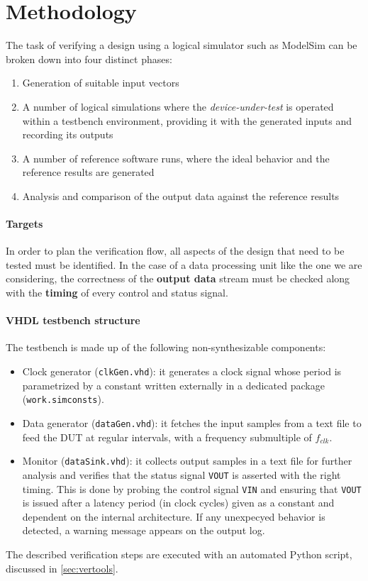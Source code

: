 \section{Methodology}
The task of verifying a design using a logical simulator such as ModelSim can be broken down into four distinct phases:
\begin{enumerate}
    \item Generation of suitable input vectors
    \item A number of logical simulations where the \textit{device-under-test} is operated within a testbench environment, providing it with the generated inputs and recording its outputs
    \item A number of reference software runs, where the ideal behavior and the reference results are generated
    \item Analysis and comparison of the output data against the reference results
\end{enumerate}

\paragraph{Targets} In order to plan the verification flow, all aspects of the design that need to be tested must be identified. In the case of a data processing unit like the one we are considering, the correctness of the \textbf{output data} stream must be checked along with the \textbf{timing} of every control and status signal.

\paragraph{VHDL testbench structure} The testbench is made up of the following non-synthesizable components:
\begin{itemize}
	\item Clock generator (\texttt{clkGen.vhd}): it generates a clock signal whose period is parametrized by a constant written externally in a dedicated package (\texttt{work.simconsts}).
	\item Data generator (\texttt{dataGen.vhd}): it fetches the input samples from a text file to feed the DUT at regular intervals, with a frequency submultiple of $f_{clk}$.
	\item Monitor (\texttt{dataSink.vhd}): it collects output samples in a text file for further analysis and verifies that the status signal \texttt{VOUT} is asserted with the right timing. This is done by probing the control signal \texttt{VIN} and ensuring that \texttt{VOUT} is issued after a latency period (in clock cycles) given as a constant and dependent on the internal architecture. If any unexpecyed behavior is detected, a warning message appears on the output log.
\end{itemize}

The described verification steps are executed with an automated Python script, discussed in \autoref{sec:vertools}.

